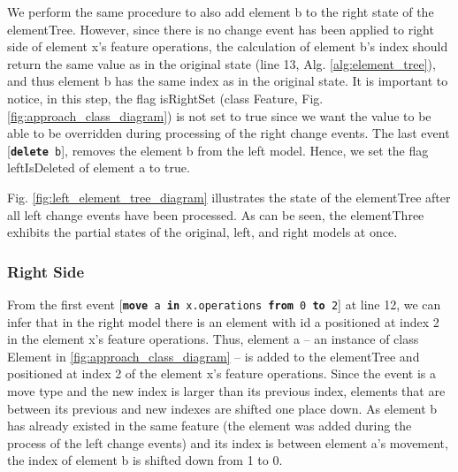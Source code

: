 \documentclass{jot}
\begin{document}
We perform the same procedure to also add element \textsf{b} to the right state of the \textsf{elementTree}. However, since there is no change event has been applied to right side of element \textsf{x}'s feature \textsf{operations}, the calculation of element \textsf{b}'s index should return the same value as in the original state (line 13, Alg. \ref{alg:element_tree}), and thus element \textsf{b} has the same index as in the original state. It is important to notice, in this step, the flag \textsf{isRightSet} (class \textsf{Feature}, Fig. \ref{fig:approach_class_diagram}) is not set to \textsf{true} since we want the value to be able to be overridden during processing of the right change events. The last event [\texttt{\small \textbf{delete} b}], removes the element \textsf{b} from the left model. Hence, we set the flag \textsf{leftIsDeleted} of element \textsf{a} to \textsf{true}.

Fig. \ref{fig:left_element_tree_diagram} illustrates the state of the \textsf{elementTree} after all left change events have been processed. As can be seen, the \textsf{elementThree} exhibits the partial states of the original, left, and right models at once. 

\subsubsection{Right Side}\label{sec:right_side}  From the first event [\texttt{\small \textbf{move} a \textbf{in} x.operations \textbf{from} 0 \textbf{to} 2}] at line 12, we can infer that in the right model there is an element with id \textsf{a} positioned at index 2 in the element \textsf{x}'s feature \textsf{operations}. Thus, element \textsf{a} -- an instance of class \textsf{Element} in \ref{fig:approach_class_diagram} -- is added to the \textsf{elementTree} and positioned at index 2 of the element \textsf{x}'s feature \textsf{operations}. Since the event is a \textsf{move} type and the new index is larger than its previous index, elements that are between its previous and new indexes are shifted one place down. As element \textsf{b} has already existed in the same feature (the element was added during the process of the left change events) and its index is between element \textsf{a}'s movement, the index of element \textsf{b} is shifted down from 1 to 0. 
\end{document}
